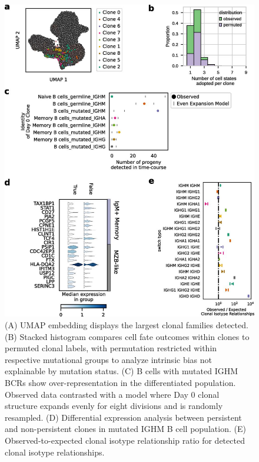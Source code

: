 \begin{figure}[hbt!]
\centering
\includegraphics[width=14cm, keepaspectratio]{figs/paper2/fig3_bcd.jpg}
\caption[Clonal families allow inference of intrinsic proliferative ability, limited clonal fate outcomes, map of class-switching in vitro.]{(A) UMAP embedding displays the largest clonal families detected. (B) Stacked histogram compares cell fate outcomes within clones to permuted clonal labels, with permutation restricted within respective mutational groups to analyze intrinsic bias not explainable by mutation status. (C) B cells with mutated IGHM BCRs show over-representation in the differentiated population. Observed data contrasted with a model where Day 0 clonal structure expands evenly for eight divisions and is randomly resampled. (D) Differential expression analysis between persistent and non-persistent clones in mutated IGHM B cell population. (E) Observed-to-expected clonal isotype relationship ratio for detected clonal isotype relationships.}
\label{fig:paper2_fig_3}
\end{figure}


